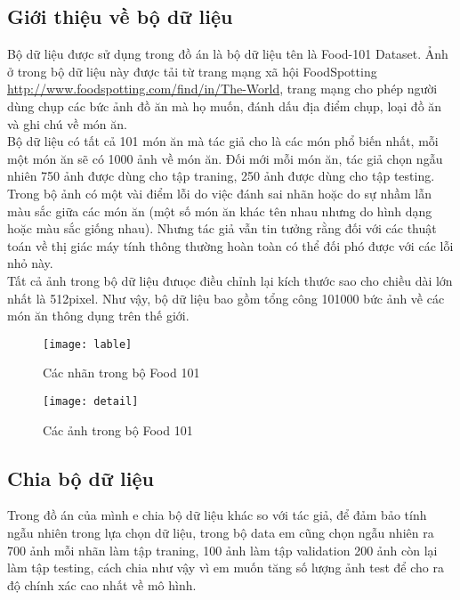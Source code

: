 \documentclass[13pt, a4paper]{extreport}
\begin{document}
\subsection{Giới thiệu về bộ dữ liệu}
\indent Bộ dữ liệu được sử dụng trong đồ án là bộ dữ liệu tên là Food-101 Dataset. Ảnh ở trong bộ dữ liệu này được tải từ trang mạng xã hội FoodSpotting \url{http://www.foodspotting.com/find/in/The-World}, trang mạng cho phép người dùng chụp các bức ảnh đồ ăn mà họ muốn, đánh dấu địa điểm chụp, loại đồ ăn và ghi chú về món ăn.\\
\indent Bộ dữ liệu có tất cả 101 món ăn mà tác giả cho là các món phổ biến nhất, mỗi một món ăn sẽ có 1000 ảnh về món ăn. Đối mới mỗi món ăn, tác giả chọn ngẫu nhiên 750 ảnh được dùng cho tập traning, 250 ảnh được dùng cho tập testing. Trong bộ ảnh có một vài điểm lỗi do việc đánh sai nhãn hoặc do sự nhầm lẫn màu sắc giữa các món ăn (một số món ăn khác tên nhau nhưng do hình dạng hoặc màu sắc giống nhau). Nhưng tác giả vẫn tin tưởng rằng đối với các thuật toán về thị giác máy tính thông thường hoàn toàn có thể đối phó được với các lỗi nhỏ này.\\
\indent Tất cả ảnh trong bộ dữ liệu đưuọc điều chỉnh lại kích thước sao cho chiều dài lớn nhất là 512pixel. Như vậy, bộ dữ liệu bao gồm tổng công 101000 bức ảnh về các món ăn thông dụng trên thế giới.
\begin{figure}[H]
  \centering
    \texttt{[image: lable]}
   \caption{\large Các nhãn trong bộ Food 101}
\end{figure}

\begin{figure}[H]
  \centering
    \texttt{[image: detail]}
   \caption{\large Các ảnh trong bộ Food 101}
\end{figure}
\subsection{Chia bộ dữ liệu}
\indent Trong đồ án của mình e chia bộ dữ liệu khác so với tác giả, để đảm bảo tính ngẫu nhiên trong lựa chọn dữ liệu, trong bộ data em cũng chọn ngẫu nhiên ra 700 ảnh mỗi nhãn làm tập traning, 100 ảnh làm tập validation 200 ảnh còn lại làm tập testing, cách chia như vậy vì em muốn tăng số lượng ảnh test để cho ra độ chính xác cao nhất về mô hình.
\end{document}
